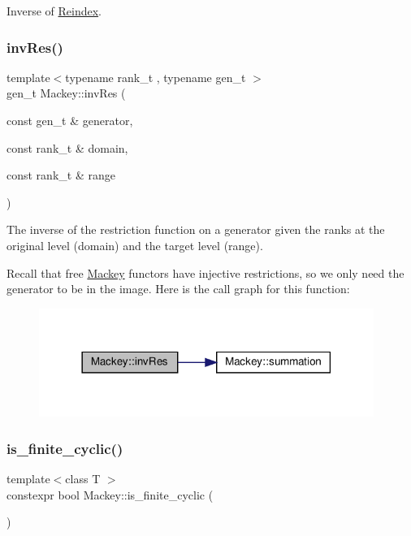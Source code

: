 Inverse of \hyperlink{namespaceMackey_a7da73ade3ee83c4ffd614e79242d7c04}{Reindex}. 

\mbox{\label{namespaceMackey_a30b5667e411ff694aa989e95e394bb41}} 
\subsubsection{\texorpdfstring{inv\+Res()}{invRes()}}
{\footnotesize\ttfamily template$<$typename rank\+\_\+t , typename gen\+\_\+t $>$ \\
gen\+\_\+t Mackey\+::inv\+Res (\begin{DoxyParamCaption}\item[{const gen\+\_\+t \&}]{generator,  }\item[{const rank\+\_\+t \&}]{domain,  }\item[{const rank\+\_\+t \&}]{range }\end{DoxyParamCaption})}

The inverse of the restriction function on a generator given the ranks at the original level (domain) and the target level (range).

Recall that free \hyperlink{namespaceMackey}{Mackey} functors have injective restrictions, so we only need the generator to be in the image. Here is the call graph for this function\+:\nopagebreak
\begin{figure}[H]
\begin{center}
\leavevmode
\includegraphics[width=309pt]{namespaceMackey_a30b5667e411ff694aa989e95e394bb41_cgraph}
\end{center}
\end{figure}
\mbox{\label{namespaceMackey_afe8e1404c86fb9609734d3e0074ac7ed}} 
\subsubsection{\texorpdfstring{is\+\_\+finite\+\_\+cyclic()}{is\_finite\_cyclic()}}
{\footnotesize\ttfamily template$<$class T $>$ \\
constexpr bool Mackey\+::is\+\_\+finite\+\_\+cyclic (\begin{DoxyParamCaption}{ }\end{DoxyParamCaption})}



